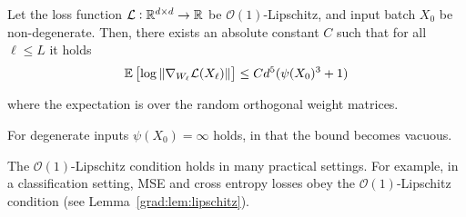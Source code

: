 \begin{theorem}\label{grad:thm:no_explosion}
Let the loss function $\mathcal{L}: \mathbb{R}^{d \times d} \to \mathbb{R}$ be $\mathcal{O}(1)$-Lipschitz, and input batch $X_0$ be non-degenerate. Then, there exists an absolute constant $C$ such that for all $\ell \leq L$ it holds
\begin{align}
    \mathbb{E} \left[ \log \| \nabla_{W_\ell} \mathcal{L}(X_\ell)\|\right] \leq  Cd^5 (\psi(X_0)^3 + 1)
\end{align}

where the expectation is over the random orthogonal weight matrices. 
\end{theorem}
\begin{remark}
    For degenerate inputs $\psi(X_0) = \infty$ holds, in that the bound becomes vacuous.  
\end{remark}
\begin{remark}
    The $\mathcal{O}(1)$-Lipschitz condition holds in many practical settings. For example, in a classification setting, MSE and cross entropy losses obey the $\mathcal{O}(1)$-Lipschitz condition (see Lemma~\ref{grad:lem:lipschitz}).
\end{remark}

